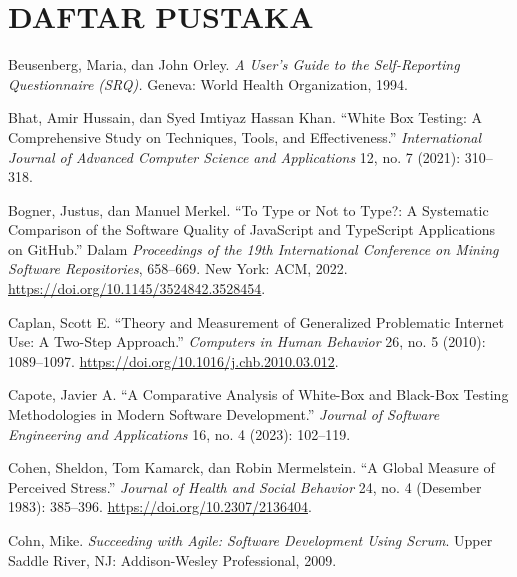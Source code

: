 \clearpage
{}
{}
\chapter*{DAFTAR PUSTAKA}

\begingroup
\singlespacing
\setlength{\parindent}{0pt}
\newcommand{\bibentry}[1]{\noindent\hangindent=1.27cm #1\par\vspace{6pt}}

\bibentry{Beusenberg, Maria, dan John Orley. \textit{A User's Guide to the Self-Reporting Questionnaire (SRQ).} Geneva: World Health Organization, 1994.}

\bibentry{Bhat, Amir Hussain, dan Syed Imtiyaz Hassan Khan. ``White Box Testing: A Comprehensive Study on Techniques, Tools, and Effectiveness.'' \textit{International Journal of Advanced Computer Science and Applications} 12, no. 7 (2021): 310--318.}

\bibentry{Bogner, Justus, dan Manuel Merkel. ``To Type or Not to Type?: A Systematic Comparison of the Software Quality of JavaScript and TypeScript Applications on GitHub.'' Dalam \textit{Proceedings of the 19th International Conference on Mining Software Repositories}, 658--669. New York: ACM, 2022. \url{https://doi.org/10.1145/3524842.3528454}.}

\bibentry{Caplan, Scott E. ``Theory and Measurement of Generalized Problematic Internet Use: A Two-Step Approach.'' \textit{Computers in Human Behavior} 26, no. 5 (2010): 1089--1097. \url{https://doi.org/10.1016/j.chb.2010.03.012}.}

\bibentry{Capote, Javier A. ``A Comparative Analysis of White-Box and Black-Box Testing Methodologies in Modern Software Development.'' \textit{Journal of Software Engineering and Applications} 16, no. 4 (2023): 102--119.}

\bibentry{Cohen, Sheldon, Tom Kamarck, dan Robin Mermelstein. ``A Global Measure of Perceived Stress.'' \textit{Journal of Health and Social Behavior} 24, no. 4 (Desember 1983): 385--396. \url{https://doi.org/10.2307/2136404}.}

\bibentry{Cohn, Mike. \textit{Succeeding with Agile: Software Development Using Scrum}. Upper Saddle River, NJ: Addison-Wesley Professional, 2009.}

